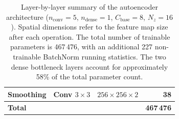 \begin{table}[H]
\begin{tabular}{@{}llrr@{}}
Smoothing       & Conv $3\times3$                    & $256\times256\times2$ & 38        \\
\midrule
\textbf{Total}  &                                    &                       & \textbf{467\,476} \\
\bottomrule
\end{tabular}
\caption{Layer-by-layer summary of the autoencoder architecture
($n_\text{conv}=5$, $n_\text{dense}=1$, $C_\text{base}=8$, $N_z=16$).
Spatial dimensions refer to the feature map size after each operation. The total
number of trainable parameters is 467\,476, with an additional 227 non-trainable
BatchNorm running statistics. The two dense bottleneck layers account for
approximately 58\% of the total parameter count.}
\label{tab: AE_params}
\end{table}


